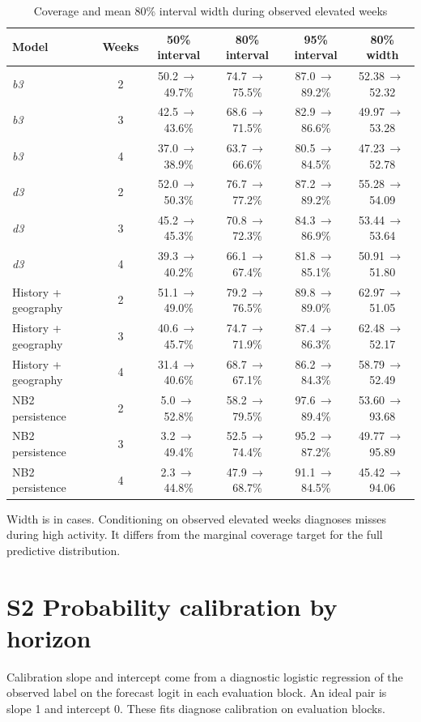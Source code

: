 \documentclass[10pt]{article}
\newcommand{\bthree}{\textit{b3}}
\newcommand{\dthree}{\textit{d3}}
\newcommand{\ra}{\,$\rightarrow$\,}
\begin{document}
\begin{table}[!h]
\centering
\caption{Coverage and mean 80\% interval width during observed elevated weeks}
\small
\begin{tabular}{@{}lccccc@{}}
\toprule
Model & Weeks & 50\% interval & 80\% interval & 95\% interval & 80\% width\\
\midrule
\bthree{} & 2 & 50.2\ra 49.7\% & 74.7\ra 75.5\% & 87.0\ra 89.2\% & 52.38\ra 52.32\\
\bthree{} & 3 & 42.5\ra 43.6\% & 68.6\ra 71.5\% & 82.9\ra 86.6\% & 49.97\ra 53.28\\
\bthree{} & 4 & 37.0\ra 38.9\% & 63.7\ra 66.6\% & 80.5\ra 84.5\% & 47.23\ra 52.78\\
\dthree{} & 2 & 52.0\ra 50.3\% & 76.7\ra 77.2\% & 87.2\ra 89.2\% & 55.28\ra 54.09\\
\dthree{} & 3 & 45.2\ra 45.3\% & 70.8\ra 72.3\% & 84.3\ra 86.9\% & 53.44\ra 53.64\\
\dthree{} & 4 & 39.3\ra 40.2\% & 66.1\ra 67.4\% & 81.8\ra 85.1\% & 50.91\ra 51.80\\
History + geography & 2 & 51.1\ra 49.0\% & 79.2\ra 76.5\% & 89.8\ra 89.0\% & 62.97\ra 51.05\\
History + geography & 3 & 40.6\ra 45.7\% & 74.7\ra 71.9\% & 87.4\ra 86.3\% & 62.48\ra 52.17\\
History + geography & 4 & 31.4\ra 40.6\% & 68.7\ra 67.1\% & 86.2\ra 84.3\% & 58.79\ra 52.49\\
NB2 persistence & 2 & 5.0\ra 52.8\% & 58.2\ra 79.5\% & 97.6\ra 89.4\% & 53.60\ra 93.68\\
NB2 persistence & 3 & 3.2\ra 49.4\% & 52.5\ra 74.4\% & 95.2\ra 87.2\% & 49.77\ra 95.89\\
NB2 persistence & 4 & 2.3\ra 44.8\% & 47.9\ra 68.7\% & 91.1\ra 84.5\% & 45.42\ra 94.06\\
\bottomrule
\end{tabular}

\vspace{2pt}\parbox{0.85\textwidth}{\footnotesize Width is in cases. Conditioning on observed elevated weeks diagnoses misses during high activity. It differs from the marginal coverage target for the full predictive distribution.}
\end{table}

\clearpage
\section*{S2 Probability calibration by horizon}
Calibration slope and intercept come from a diagnostic logistic regression of the observed label on the forecast logit in each evaluation block. An ideal pair is slope 1 and intercept 0. These fits diagnose calibration on evaluation blocks.
\end{document}
